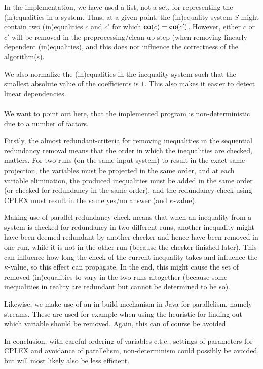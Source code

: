 In the implementation, we have used a list, not a set, for representing the (in)equalities in a system. Thus, at a given point, the (in)equality system $S$ might contain two (in)equalities $c$ and $c'$ for which $\mathbf{co}(c)=\mathbf{co}(c')$. However, either $c$ or $c'$ will be removed in the preprocessing/clean up step (when removing linearly dependent (in)equalities), and this does not influence the correctness of the algorithm(s).

We also normalize the (in)equalities in the inequality system such that the smallest absolute value of the coefficients is $1$. This also makes it easier to detect linear dependencies. 
\\
\\
We want to point out here, that the implemented program is non-deterministic due to a number of factors. 

Firstly, the almost redundant-criteria for removing inequalities in the sequential redundancy removal means that the order in which the inequalities are checked, matters. 
For two runs (on the same input system) to result in the exact  same projection, the variables must be projected in the same order, and at each variable elimination, the produced inequalities must be added in the same order (or checked for redundancy in the same order), and the redundancy check using CPLEX must result in the same yes/no answer (and $\kappa$-value). %
 
Making use of parallel redundancy check means that when an inequality from a system is checked for redundancy in two different runs, another inequality might have been deemed redundant by another checker and hence have been removed in one run, while it is not in the other run (because the checker finished later). This can influence how long the check of the current inequality takes and influence the $\kappa$-value, so this effect can propagate. In the end, this might cause the set of removed (in)equalities to vary in the two runs altogether (because some inequalities in reality are redundant but cannot be determined to be so). 

Likewise, we make use of an in-build mechanism in Java for parallelism, namely streams. These are used for example when using the heuristic for finding out which variable should be removed. Again, this can of course be avoided.

In conclusion, with careful ordering of variables e.t.c., settings of parameters for CPLEX and avoidance of parallelism, non-determinism could possibly be avoided, but will most likely also be less efficient.  
